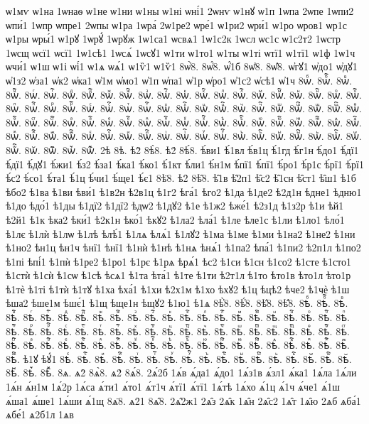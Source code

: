 {ѡ1мѵ
ѡ1на
1ѡнаѳ
ѡ1не
ѡ1ни
ѡ1ны
ѡ1ні
ѡні́1
2ѡнѵ
ѡ1нꙋ
ѡ1п
1ѡпа
2ѡпе
1ѡпи2
ѡпи́1
1ѡпр
ѡпре1
2ѡпы
ѡ1ра
1ѡра́
2ѡ1ре2
ѡре́1
ѡ1ри2
ѡри́1
ѡ1ро
ѡров1
ѡр1с
ѡ1ры
ѡры́1
ѡ1рꙋ
1ѡрꙋ́
1ѡрꙋж
1ѡ1са1
ѡсвѧ1
1ѡ1с2к
1ѡсл
ѡс1с
ѡ1с2т2
1ѡстр
1ѡсщ
ѡсї1
ѡсї1
1ѡ1сѣ1
1ѡсѧ́
1ѡсꙋ1
ѡ1ти
ѡ1то1
ѡ1ты
ѡ1ті
ѡтї1
ѡ1тї1
ѡ1ф
1ѡ1ч
ѡчи́1
ѡ1ш
ѡ1і
ѡі́1
ѡ1ѧ
ѡѧ́1
ѡ1ѷ1
ѡ1ѷ1
8ѡ҆̀8.
8ѡ҆́8.
ѡ҆́1б
8ѡ҆̈8.
8ѡ҆̑8.
ѡ҆гꙋ1
ѡ҆до1
ѡ҆дꙋ1
ѡ҆1з2
ѡ҆за1
ѡ҆к2
ѡ҆ка1
ѡ҆1м
ѡ҆мо1
ѡ҆1п
ѡ҆па1
ѡ҆1р
ѡ҆ро1
ѡ҆1с2
ѡ҆сѣ1
ѡ҆1ч
8ѡⷠ.
8ѡⷠ҇.
8ѡⷡ.
8ѡⷡ҇.
8ѡⷢ.
8ѡⷢ҇.
8ѡⷣ.
8ѡⷣ҇.
8ѡⷤ.
8ѡⷤ҇.
8ѡⷥ.
8ѡⷥ҇.
8ѡⷦ.
8ѡⷦ҇.
8ѡⷧ.
8ѡⷧ҇.
8ѡⷨ.
8ѡⷨ҇.
8ѡⷩ.
8ѡⷩ҇.
8ѡⷪ.
8ѡⷪ҇.
8ѡⷫ.
8ѡⷫ҇.
8ѡⷬ.
8ѡⷬ҇.
8ѡⷭ.
8ѡⷭ҇.
8ѡⷮ.
8ѡⷮ҇.
8ѡⷯ.
8ѡⷯ҇.
8ѡⷰ.
8ѡⷰ҇.
8ѡⷱ.
8ѡⷱ҇.
8ѡⷲ.
8ѡⷲ҇.
8ѡⷳ.
8ѡⷳ҇.
8ѡⷴ.
8ѡⷴ҇.
8ѡⷵ.
8ѡⷵ҇.
8ѡⷶ.
8ѡⷶ҇.
8ѡⷷ.
8ѡⷷ҇.
8ѡⷸ.
8ѡⷸ҇.
8ѡⷹ.
8ѡⷹ҇.
8ѡⷺ.
8ѡⷺ҇.
8ѡⷻ.
8ѡⷻ҇.
8ѡⷼ.
8ѡⷼ҇.
8ѡⷽ.
8ѡⷽ҇.
8ѡⷾ.
8ѡⷾ҇.
8ѡⷿ.
8ѡⷿ҇.
8ѡꙴ.
8ѡꙴ҇.
8ѡꙵ.
8ѡꙵ҇.
8ѡꙶ.
8ѡꙶ҇.
8ѡꙷ.
8ѡꙷ҇.
8ѡꙸ.
8ѡꙸ҇.
8ѡꙹ.
8ѡꙹ҇.
8ѡꙺ.
8ѡꙺ҇.
8ѡꙻ.
8ѡꙻ҇.
8ѡ꙼.
8ѡ꙼҇.
8ѡ꙽.
8ѡ꙽҇.
2ѣ
8ѣ.
ѣ2̀
8ѣ̀8.
ѣ2́
8ѣ́8.
ѣ́ви1
ѣ́1вл
ѣ́в1ц
ѣ́1гд
ѣ́г1н
ѣ́до1
ѣ́дї1
ѣ́дї1
ѣ́дꙋ1
ѣ́жи1
ѣ́з2
ѣ́за1
ѣ́ка1
ѣ́ко1
ѣ́1кт
ѣ́ли1
ѣ́н1м
ѣ́пї1
ѣ́пї1
ѣ́ро1
ѣ́р1с
ѣ́рї1
ѣ́рї1
ѣ́с2
ѣ́со1
ѣ́та1
ѣ́1ц
ѣ́чи1
ѣ́ще1
ѣ́є1
8ѣ̈8.
ѣ2̑
8ѣ̑8.
ѣ̑1в
ѣ̑2п1
ѣ̑с2
ѣ̑1сн
ѣ̑ст1
ѣ̑ш1
ѣ1б
ѣбо2
ѣ1ва
ѣ1ви
ѣви́1
ѣ1в2н
ѣ2в1ц
ѣ1г2
ѣга́1
ѣго2
ѣ1да
ѣ1де2
ѣ2д1н
ѣдне1
ѣдню1
ѣ1до
ѣдо́1
ѣ1ды
ѣ1дї2
ѣ1дї2
ѣдѡ2
ѣ1дꙋ2
ѣ1е
ѣ1ж2
ѣже́1
ѣ2з1д
ѣ1з2р
ѣ1и
ѣй1
ѣ2й1
ѣ1к
ѣка2
ѣки́1
ѣ2к1н
ѣко́1
ѣкꙋ2
ѣ1ла2
ѣла́1
ѣ1ле
ѣле1с
ѣ1ли
ѣ1ло1
ѣло́1
ѣ1лє
ѣ1лѝ
ѣ1лѡ
ѣ1лѣ
ѣлѣ́1
ѣ1лѧ
ѣлѧ́1
ѣ1лꙋ2
ѣ1ма
ѣ1ме
ѣ1ми
ѣ1на2
ѣ1не2
ѣ1ни
ѣ1но2
ѣн1ц
ѣн1ч
ѣнї1
ѣнї1
ѣ1нѝ
ѣ1нѣ
ѣ1нѧ
ѣнѧ́1
ѣ1па2
ѣпа́1
ѣ1пи2
ѣ2п1л
ѣ1по2
ѣ1пі
ѣпі́1
ѣ1пѝ
ѣ1ре2
ѣ1ро1
ѣ1рє
ѣ1рѧ
ѣрѧ́1
ѣс2
ѣ1си
ѣ1сн
ѣ1со2
ѣ1сте
ѣ1сто1
ѣ1стѝ
ѣ1сѝ
ѣ1сѡ
ѣ1сѣ
ѣсѧ1
ѣ1та
ѣта́1
ѣ1те
ѣ1ти
ѣ2т1л
ѣ1то
ѣто1в
ѣто1л
ѣто1р
ѣ1тѐ
ѣ1ті
ѣ1тѝ
ѣ1тꙋ
ѣ1ха
ѣха́1
ѣ1хи
ѣ2х1м
ѣ1хо
ѣхꙋ2
ѣ1ц
ѣцѣ2
ѣче2
ѣ1чѐ
ѣ1ш
ѣша2
ѣше1м
ѣшє́1
ѣ1щ
ѣще1н
ѣщꙋ2
ѣ1ю1
ѣ1ѧ
8ѣ҆̀8.
8ѣ҆́8.
8ѣ҆̈8.
8ѣ҆̑8.
8ѣⷠ.
8ѣⷠ҇.
8ѣⷡ.
8ѣⷡ҇.
8ѣⷢ.
8ѣⷢ҇.
8ѣⷣ.
8ѣⷣ҇.
8ѣⷤ.
8ѣⷤ҇.
8ѣⷥ.
8ѣⷥ҇.
8ѣⷦ.
8ѣⷦ҇.
8ѣⷧ.
8ѣⷧ҇.
8ѣⷨ.
8ѣⷨ҇.
8ѣⷩ.
8ѣⷩ҇.
8ѣⷪ.
8ѣⷪ҇.
8ѣⷫ.
8ѣⷫ҇.
8ѣⷬ.
8ѣⷬ҇.
8ѣⷭ.
8ѣⷭ҇.
8ѣⷮ.
8ѣⷮ҇.
8ѣⷯ.
8ѣⷯ҇.
8ѣⷰ.
8ѣⷰ҇.
8ѣⷱ.
8ѣⷱ҇.
8ѣⷲ.
8ѣⷲ҇.
8ѣⷳ.
8ѣⷳ҇.
8ѣⷴ.
8ѣⷴ҇.
8ѣⷵ.
8ѣⷵ҇.
8ѣⷶ.
8ѣⷶ҇.
8ѣⷷ.
8ѣⷷ҇.
8ѣⷸ.
8ѣⷸ҇.
8ѣⷹ.
8ѣⷹ҇.
8ѣⷺ.
8ѣⷺ҇.
8ѣⷻ.
8ѣⷻ҇.
8ѣⷼ.
8ѣⷼ҇.
8ѣⷽ.
8ѣⷽ҇.
8ѣⷾ.
8ѣⷾ҇.
8ѣⷿ.
8ѣⷿ҇.
ѣ1ꙋ
ѣꙋ́1
8ѣꙴ.
8ѣꙴ҇.
8ѣꙵ.
8ѣꙵ҇.
8ѣꙶ.
8ѣꙶ҇.
8ѣꙷ.
8ѣꙷ҇.
8ѣꙸ.
8ѣꙸ҇.
8ѣꙹ.
8ѣꙹ҇.
8ѣꙺ.
8ѣꙺ҇.
8ѣꙻ.
8ѣꙻ҇.
8ѣ꙼.
8ѣ꙼҇.
8ѣ꙽.
8ѣ꙽҇.
8ѧ.
ѧ2̀
8ѧ̀8.
ѧ2́
8ѧ́8.
2ѧ́2б
1ѧ́в
ѧ́да1
ѧ́до1
1ѧ́з1в
ѧ́зл1
ѧ́ка1
1ѧ́ла
1ѧ́ли
1ѧ́н
ѧ́н1м
1ѧ́2р
1ѧ́са
ѧ́ти1
ѧ́то1
ѧ́т1ч
ѧ́тї1
ѧ́тї1
1ѧ́тѣ
1ѧ́хо
ѧ́1ц
ѧ́1ч
ѧ́че1
ѧ́1ш
ѧ́ша1
ѧ́ше1
1ѧ́ши
ѧ́1щ
8ѧ̈8.
ѧ2̑1
8ѧ̑8.
2ѧ̑2ж1
2ѧ̑з
2ѧ̑к
1ѧ̑н
2ѧ̑с2
1ѧ̑т
1ѧ̑ю
2ѧб
ѧба́1
ѧбе́1
ѧ2б1л
1ѧв
}
